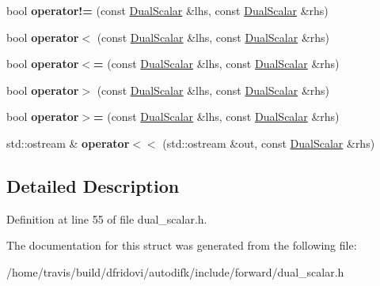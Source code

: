 \begin{DoxyCompactItemize}
\item 
\hypertarget{structautodifk_1_1forward_1_1_dual_scalar_aaee9f7e5aae1478510ae5a600fbf731c}{bool {\bfseries operator!=} (const \hyperlink{structautodifk_1_1forward_1_1_dual_scalar}{Dual\-Scalar} \&lhs, const \hyperlink{structautodifk_1_1forward_1_1_dual_scalar}{Dual\-Scalar} \&rhs)}\label{structautodifk_1_1forward_1_1_dual_scalar_aaee9f7e5aae1478510ae5a600fbf731c}

\item 
\hypertarget{structautodifk_1_1forward_1_1_dual_scalar_a4d17a1fd2cfbf6e25e9a41faf628eb89}{bool {\bfseries operator$<$} (const \hyperlink{structautodifk_1_1forward_1_1_dual_scalar}{Dual\-Scalar} \&lhs, const \hyperlink{structautodifk_1_1forward_1_1_dual_scalar}{Dual\-Scalar} \&rhs)}\label{structautodifk_1_1forward_1_1_dual_scalar_a4d17a1fd2cfbf6e25e9a41faf628eb89}

\item 
\hypertarget{structautodifk_1_1forward_1_1_dual_scalar_aaf25c9a7e82161137ab26bb950ea2ef0}{bool {\bfseries operator$<$=} (const \hyperlink{structautodifk_1_1forward_1_1_dual_scalar}{Dual\-Scalar} \&lhs, const \hyperlink{structautodifk_1_1forward_1_1_dual_scalar}{Dual\-Scalar} \&rhs)}\label{structautodifk_1_1forward_1_1_dual_scalar_aaf25c9a7e82161137ab26bb950ea2ef0}

\item 
\hypertarget{structautodifk_1_1forward_1_1_dual_scalar_ae6a690f333d5990f1e951f7854116439}{bool {\bfseries operator$>$} (const \hyperlink{structautodifk_1_1forward_1_1_dual_scalar}{Dual\-Scalar} \&lhs, const \hyperlink{structautodifk_1_1forward_1_1_dual_scalar}{Dual\-Scalar} \&rhs)}\label{structautodifk_1_1forward_1_1_dual_scalar_ae6a690f333d5990f1e951f7854116439}

\item 
\hypertarget{structautodifk_1_1forward_1_1_dual_scalar_accce569fb424fe941de94ababf797f1f}{bool {\bfseries operator$>$=} (const \hyperlink{structautodifk_1_1forward_1_1_dual_scalar}{Dual\-Scalar} \&lhs, const \hyperlink{structautodifk_1_1forward_1_1_dual_scalar}{Dual\-Scalar} \&rhs)}\label{structautodifk_1_1forward_1_1_dual_scalar_accce569fb424fe941de94ababf797f1f}

\item 
\hypertarget{structautodifk_1_1forward_1_1_dual_scalar_a80e063d53875f05090676f54f6d1a497}{std\-::ostream \& {\bfseries operator$<$$<$} (std\-::ostream \&out, const \hyperlink{structautodifk_1_1forward_1_1_dual_scalar}{Dual\-Scalar} \&rhs)}\label{structautodifk_1_1forward_1_1_dual_scalar_a80e063d53875f05090676f54f6d1a497}

\end{DoxyCompactItemize}


\subsection{Detailed Description}


Definition at line 55 of file dual\-\_\-scalar.\-h.



The documentation for this struct was generated from the following file\-:\begin{DoxyCompactItemize}
\item 
/home/travis/build/dfridovi/autodifk/include/forward/dual\-\_\-scalar.\-h\end{DoxyCompactItemize}
